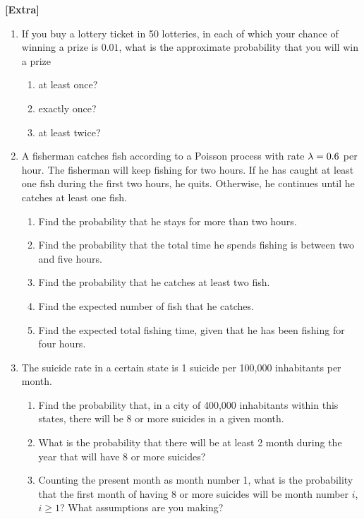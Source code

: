 \documentclass[12pt]{article}%
\newcommand{\0}{{\bf 0}}
\begin{document}
\begin{center}
{\Large\bf [Extra]} 
\end{center}






\begin{enumerate}
\item
If you buy a lottery ticket in 50 lotteries, in each of which your chance of winning a prize is $0.01$, what
is the approximate probability that you will win a prize
\begin{enumerate}
\item
at least once? 
\item
exactly once? 
\item
at least twice?
\end{enumerate}








\item 
A fisherman catches fish according to a Poisson process with rate $\lambda=0.6$ per hour. The fisherman will keep fishing for two hours. If he has caught at least one fish during the first two hours, he quits. Otherwise, he continues until he catches at least one fish.
\begin{enumerate}
\item Find the probability that he stays for more than two hours.
\item Find the probability that the total time he spends fishing is between two and five hours.
\item Find the probability that he catches at least two fish.
\item Find the expected number of fish that he catches.
\item Find the expected total fishing time, given that he has been fishing for four hours.
\end{enumerate}







\item
The suicide rate in a certain state is 1 suicide per 100,000 inhabitants per month. 
\begin{enumerate}
\item  
Find the probability that, in a city of 400,000 inhabitants within this states, there will be 8 or more suicides in a given month.
\item 
What is the probability that there will be at least 2 month during the year 
that will have 8 or more suicides?
\item 
Counting the present month as month number 1, 
what is the probability that the first month of having 8 or more suicides will be month number $i$, $i \ge1$?
What assumptions are you making? 
\end{enumerate}










\end{enumerate}
\end{document}
